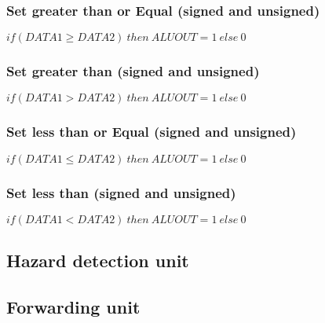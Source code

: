 \subsubsection{Set greater than or Equal (signed and unsigned)}
$ \mathit{if (DATA1 \geq DATA2) \: then} \: \mathit{ALUOUT} = 1 \: \mathit{else} \: 0 $

\subsubsection{Set greater than (signed and unsigned)}
$ \mathit{if (DATA1 > DATA2) \: then} \: \mathit{ALUOUT} = 1 \: \mathit{else} \: 0 $

\subsubsection{Set less than or Equal (signed and unsigned)}
$ \mathit{if (DATA1 \leq DATA2) \: then} \: \mathit{ALUOUT} = 1 \: \mathit{else} \: 0 $

\subsubsection{Set less than (signed and unsigned)}
$ \mathit{if (DATA1 < DATA2) \: then} \: \mathit{ALUOUT} = 1 \: \mathit{else} \: 0 $

\subsection{Hazard detection unit}
\subsection{Forwarding unit}
